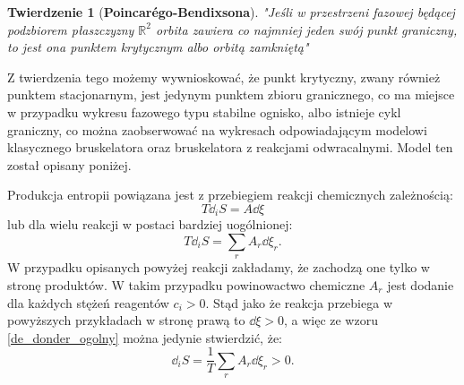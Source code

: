 \documentclass[10pt, a4paper, twoside, onecolumn]{article}
\numberwithin{equation}{section}
\newtheorem*{theorem}{Twierdzenie}
\begin{document}
	\begin{theorem}[\textbf{Poincar\'{e}go-Bendixsona}]
		"Jeśli w przestrzeni fazowej będącej podzbiorem płaszczyzny \(\mathbb{R}^{2}\) orbita zawiera co najmniej jeden swój punkt graniczny, to jest ona punktem krytycznym albo orbitą zamkniętą" \cite{palczewski}
	\end{theorem}
	Z twierdzenia tego możemy wywnioskować, że punkt krytyczny, zwany również punktem stacjonarnym, jest jedynym punktem zbioru granicznego, co ma miejsce w przypadku wykresu fazowego typu stabilne ognisko, albo istnieje cykl graniczny, co można zaobserwować na wykresach odpowiadającym modelowi klasycznego bruskelatora oraz bruskelatora z reakcjami odwracalnymi. Model ten został opisany poniżej. \par
	Produkcja entropii powiązana jest z przebiegiem reakcji chemicznych zależnością:
	\begin{equation}\label{de_donder}
		T\dd_{i}S=A\dd{\xi}
	\end{equation}
	lub dla wielu reakcji w postaci bardziej uogólnionej: 
	\begin{equation}\label{de_donder_ogolny}
		T\dd_{i}S=\sum_{r}A_{r}\dd{\xi_{r}}.
	\end{equation}
	W przypadku opisanych powyżej reakcji zakładamy, że zachodzą one tylko w stronę produktów. W takim przypadku powinowactwo chemiczne $A_{r}$ jest dodanie dla każdych stężeń reagentów \(c_{i}>0\). Stąd jako że reakcja przebiega w powyższych przykładach w stronę prawą to \(\dd{\xi}>0\), a więc ze wzoru \eqref{de_donder_ogolny} można jedynie stwierdzić, że:
	\begin{equation}
		\dd_{i}S=\frac{1}{T}\sum_{r}A_{r}\dd{\xi_{r}}>0.
	\end{equation}
\end{document}
